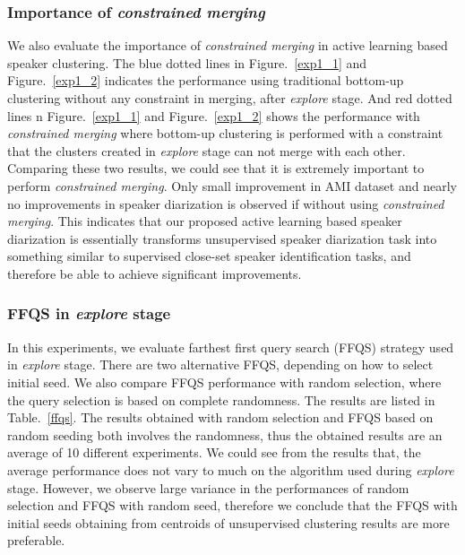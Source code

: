 \documentclass[journal]{IEEEtran}
\begin{document}
\subsubsection{Importance of \textit{constrained merging}}
We also evaluate the importance of \textit{constrained merging} in active learning based speaker clustering. The blue dotted lines in Figure.~\ref{exp1_1} and Figure.~\ref{exp1_2} indicates the performance using traditional bottom-up clustering without any constraint in merging, after \textit{explore} stage. And red dotted lines n Figure.~\ref{exp1_1} and Figure.~\ref{exp1_2} shows the performance with \textit{constrained merging} where bottom-up clustering is performed with a constraint that the clusters created in \textit{explore} stage can not merge with each other. Comparing these two results, we could see that it is extremely important to perform \textit{constrained merging}. Only small improvement in AMI dataset and nearly no improvements in speaker diarization is observed if without using \textit{constrained merging}. This indicates that our proposed active learning based speaker diarization is essentially transforms unsupervised speaker diarization task into something similar to supervised close-set speaker identification tasks, and therefore be able to achieve significant improvements.

\subsubsection{FFQS in \textit{explore} stage}
In this experiments, we evaluate farthest first query search (FFQS) strategy used in \textit{explore} stage. There are two alternative FFQS, depending on how to select initial seed. We also compare FFQS performance with random selection, where the query selection is based on complete randomness. The results are listed in Table.~\ref{ffqs}. The results obtained with random selection and FFQS based on random seeding both involves the randomness, thus the obtained results are an average of 10 different experiments. We could see from the results that, the average performance does not vary to much on the algorithm used during \textit{explore} stage. However, we observe large variance in the performances of random selection and FFQS with random seed, therefore we conclude that the FFQS with initial seeds obtaining from centroids of unsupervised clustering results are more preferable.
\end{document}
